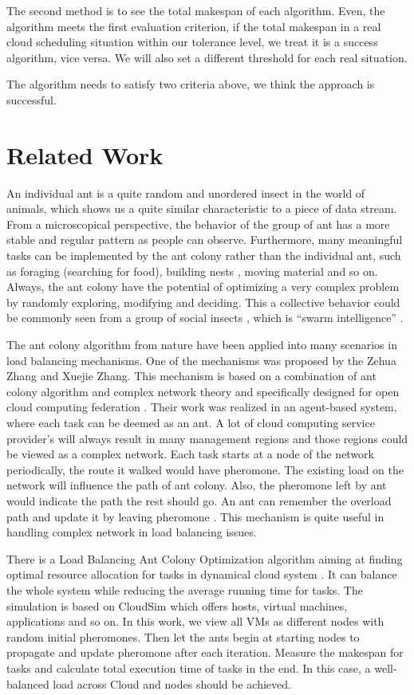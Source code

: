 \documentclass[conference]{IEEEtran}
\begin{document}
The second method is to see the total makespan of each algorithm. Even, the algorithm meets the first evaluation criterion, if the total makespan in a real cloud scheduling situation within our tolerance level, we treat it is a success algorithm, vice versa. We will also set a different threshold for each real situation.

The algorithm needs to satisfy two criteria above, we think the approach is successful.

\section{Related Work}

An individual ant is a quite random and unordered insect in the world of animals, which shows us a quite similar characteristic to a piece of data stream. From a microscopical perspective, the behavior of the group of ant has a more stable and regular pattern as people can observe. Furthermore, many meaningful tasks can be implemented by the ant colony rather than the individual ant, such as foraging (searching for food), building nests \cite{b8}\cite{b9}, moving material and so on. Always, the ant colony have the potential of optimizing a very complex problem by randomly exploring, modifying and deciding. This a collective behavior could be commonly seen from a group of social insects \cite{b10}, which is “swarm intelligence” \cite{b11}. 

The ant colony algorithm from nature have been applied into many scenarios in load balancing mechanisms. One of the mechanisms was proposed by the Zehua Zhang and Xuejie Zhang. This mechanism is based on a combination of ant colony algorithm and complex network theory and specifically designed for open cloud computing federation \cite{b7}. Their work was realized in an agent-based system, where each task can be deemed as an ant. A lot of cloud computing service provider’s will always result in many management regions and those regions could be viewed as a complex network. Each task starts at a node of the network periodically, the route it walked would have pheromone. The existing load on the network will influence the path of ant colony. Also, the pheromone left by ant would indicate the path the rest should go. An ant can remember the overload path and update it by leaving pheromone \cite{b7}. This mechanism is quite useful in handling complex network in load balancing issues.

There is a Load Balancing Ant Colony Optimization algorithm aiming at finding optimal resource allocation for tasks in dynamical cloud system \cite{b6}. It can balance the whole system while reducing the average running time for tasks. The simulation is based on CloudSim which offers hosts, virtual machines, applications and so on. In this work, we view all VMs as different nodes with random initial pheromones. Then let the ants begin at starting nodes to propagate and update pheromone after each iteration. Measure the makespan for tasks and calculate total execution time of tasks in the end. In this case, a well-balanced load across Cloud and nodes should be achieved.
\end{document}
